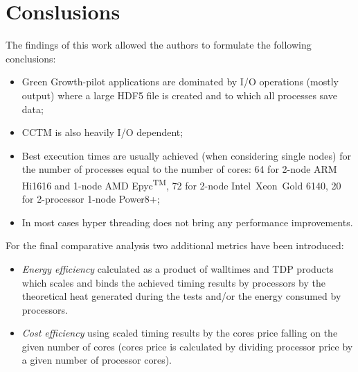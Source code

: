 \section{Conslusions}
\label{sec:summary}

The findings of this work allowed the authors to formulate the following conclusions:
\begin{itemize}
  \item[\textbullet]Green Growth-pilot applications are dominated by I/O operations (mostly output) where a large HDF5 file is created and to which all processes save data;
  \item[\textbullet]CCTM is also heavily I/O dependent;
  \item[\textbullet]Best execution times are usually achieved (when considering single nodes) for the number of processes equal to the number of cores: 64 for 2-node ARM Hi1616 and 1-node AMD Epyc\textsuperscript{TM}, 72 for 2-node Intel\textregistered\ Xeon\textregistered\ Gold 6140, 20 for 2-processor 1-node Power8+;
  \item[\textbullet]In most cases hyper threading does not bring any performance improvements.
\end{itemize}

For the final comparative analysis two additional metrics have been introduced: 
\begin{itemize}
  \item[\textbullet]\textit{Energy efficiency} calculated as a product of walltimes and TDP products which scales and binds the achieved timing results by processors by the theoretical heat generated during the tests and/or the energy consumed by processors.
  \item[\textbullet]\textit{Cost efficiency} using scaled timing results by the cores price falling on the given number of cores (cores price is calculated by dividing processor price by a given number of processor cores).
\end{itemize}


